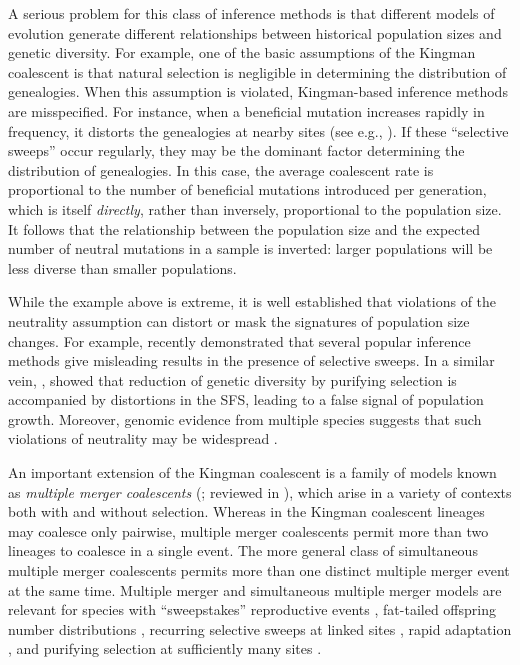 \documentclass[11pt, letterpaper]{article}   	%
\begin{document}
A serious problem for this class of inference methods is that different models of evolution generate different relationships between historical population sizes and genetic diversity.
For example, one of the basic assumptions of the Kingman coalescent is that natural selection is negligible in determining the distribution of genealogies.
When this assumption is violated, Kingman-based inference methods are misspecified.
For instance, when a beneficial mutation increases rapidly in frequency, it distorts the genealogies at nearby sites (see e.g., \cite{CoopRalph2012}).
If these ``selective sweeps'' occur regularly, they may be the dominant factor determining the distribution of genealogies.
In this case, the average coalescent rate is proportional to the number of beneficial mutations introduced per generation, which is itself \emph{directly}, rather than inversely, proportional to the population size.
It follows that the relationship between the population size and the expected number of neutral mutations in a sample is inverted: larger populations will be less diverse than smaller populations.

While the example above is extreme, it is well established that violations of the neutrality assumption can distort or mask the signatures of population size changes.
For example, \textcite{SchriderEtAl2016} recently demonstrated that several popular inference methods give misleading results in the presence of selective sweeps.
In a similar vein, \textcite{CvijovicEtAl2018}, showed that reduction of genetic diversity by purifying selection is accompanied by distortions in the SFS, leading to a false signal of population growth.
Moreover, genomic evidence from multiple species suggests that such violations of neutrality may be widespread \autocite{SellaEtAl2009, Corbett-DetigEtAl2015, KernHahn2018}.

An important extension of the Kingman coalescent is a family of models known as \textit{multiple merger coalescents} (\cite{Pitman1999, Sagitov1999, DonnellyKurtz1999,}; reviewed in \cite{Eldon2016}), which arise in a variety of contexts both with and without selection.
Whereas in the Kingman coalescent lineages may coalesce only pairwise, multiple merger coalescents permit more than two lineages to coalesce in a single event.
The more general class of simultaneous multiple merger coalescents \autocite{Schweinsberg2000, MohleSagitov2001, Sagitov2003} permits more than one distinct multiple merger event at the same time.
Multiple merger and simultaneous multiple merger models are relevant for species with
``sweepstakes'' reproductive events \autocite{EldonWakeley2006, SargsyanWakeley2008},
fat-tailed offspring number distributions \autocite{Schweinsberg2003},
recurring selective sweeps at linked sites \autocite{DurrettSchweinsberg2005, CoopRalph2012},
rapid adaptation \autocite{NeherHallatschek2013, DesaiEtAl2013},
and purifying selection at sufficiently many sites \autocite{SegerEtAl2010, NicolaisenDesai2012, GoodEtAl2014}.
\end{document}
